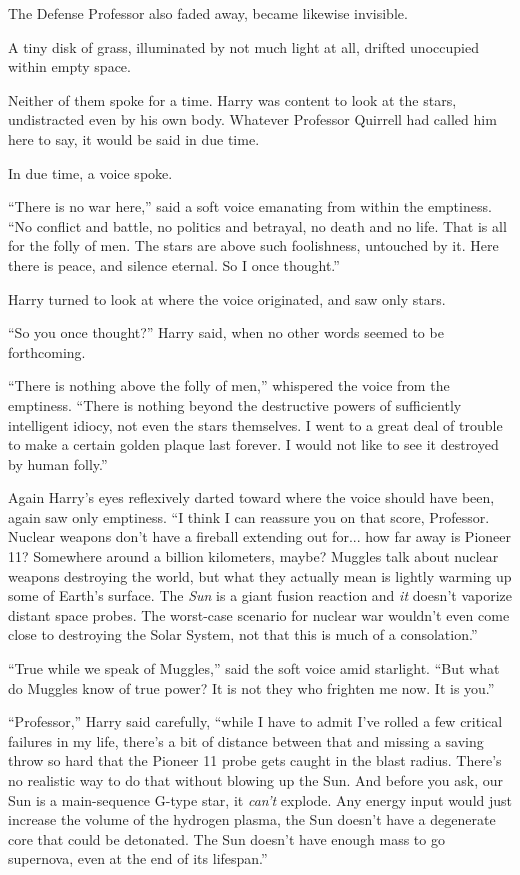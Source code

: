 The Defense Professor also faded away, became likewise invisible.

A tiny disk of grass, illuminated by not much light at all, drifted unoccupied within empty space.

Neither of them spoke for a time. Harry was content to look at the stars, undistracted even by his own body. Whatever Professor Quirrell had called him here to say, it would be said in due time.

In due time, a voice spoke.

``There is no war here,'' said a soft voice emanating from within the emptiness. ``No conflict and battle, no politics and betrayal, no death and no life. That is all for the folly of men. The stars are above such foolishness, untouched by it. Here there is peace, and silence eternal. So I once thought.''

Harry turned to look at where the voice originated, and saw only stars.

``So you once thought?'' Harry said, when no other words seemed to be forthcoming.

``There is nothing above the folly of men,'' whispered the voice from the emptiness. ``There is nothing beyond the destructive powers of sufficiently intelligent idiocy, not even the stars themselves. I went to a great deal of trouble to make a certain golden plaque last forever. I would not like to see it destroyed by human folly.''

Again Harry's eyes reflexively darted toward where the voice should have been, again saw only emptiness. ``I think I can reassure you on that score, Professor. Nuclear weapons don't have a fireball extending out for... how far away is Pioneer 11? Somewhere around a billion kilometers, maybe? Muggles talk about nuclear weapons destroying the world, but what they actually mean is lightly warming up some of Earth's surface. The \emph{Sun} is a giant fusion reaction and \emph{it} doesn't vaporize distant space probes. The worst-case scenario for nuclear war wouldn't even come close to destroying the Solar System, not that this is much of a consolation.''

``True while we speak of Muggles,'' said the soft voice amid starlight. ``But what do Muggles know of true power? It is not they who frighten me now. It is you.''

``Professor,'' Harry said carefully, ``while I have to admit I've rolled a few critical failures in my life, there's a bit of distance between that and missing a saving throw so hard that the Pioneer 11 probe gets caught in the blast radius. There's no realistic way to do that without blowing up the Sun. And before you ask, our Sun is a main-sequence G-type star, it \emph{can't} explode. Any energy input would just increase the volume of the hydrogen plasma, the Sun doesn't have a degenerate core that could be detonated. The Sun doesn't have enough mass to go supernova, even at the end of its lifespan.''

